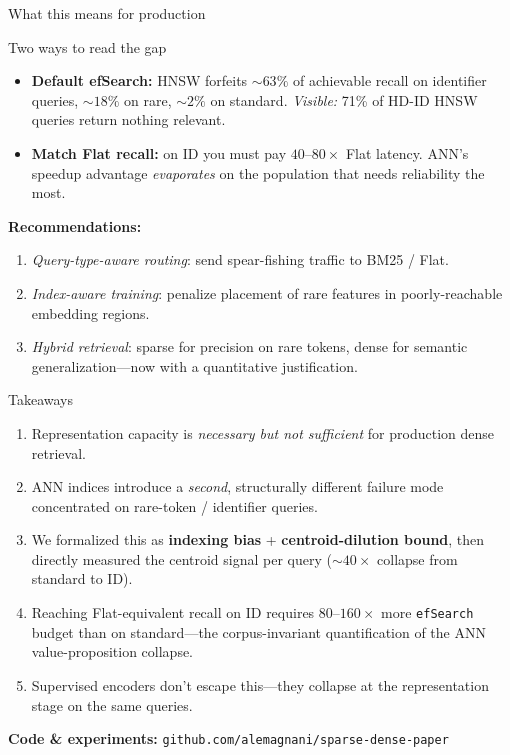 \documentclass[10pt,aspectratio=169]{beamer}
\begin{document}
\begin{frame}{What this means for production}
  \begin{block}{Two ways to read the gap}
    \begin{itemize}
      \item \textbf{Default efSearch:} HNSW forfeits $\sim 63\%$ of achievable
            recall on identifier queries, $\sim 18\%$ on rare, $\sim 2\%$ on standard.
            \emph{Visible:} 71\% of HD-ID HNSW queries return nothing relevant.
      \item \textbf{Match Flat recall:} on ID you must pay $40$--$80\times$ Flat
            latency. ANN's speedup advantage \emph{evaporates} on the population
            that needs reliability the most.
    \end{itemize}
  \end{block}

  \medskip
  \textbf{Recommendations:}
  \begin{enumerate}
    \item \emph{Query-type-aware routing}: send spear-fishing traffic to BM25 / Flat.
    \item \emph{Index-aware training}: penalize placement of rare features in
          poorly-reachable embedding regions.
    \item \emph{Hybrid retrieval}: sparse for precision on rare tokens, dense for
          semantic generalization---now with a quantitative justification.
  \end{enumerate}
\end{frame}

\begin{frame}{Takeaways}
  \begin{enumerate}
    \item Representation capacity is \emph{necessary but not sufficient} for
          production dense retrieval.
    \item ANN indices introduce a \emph{second}, structurally different failure
          mode concentrated on rare-token / identifier queries.
    \item We formalized this as \textbf{indexing bias} + \textbf{centroid-dilution
          bound}, then directly measured the centroid signal per query
          ($\sim 40\times$ collapse from standard to ID).
    \item Reaching Flat-equivalent recall on ID requires $80$--$160\times$ more
          \texttt{efSearch} budget than on standard---the corpus-invariant
          quantification of the ANN value-proposition collapse.
    \item Supervised encoders don't escape this---they collapse at the
          representation stage on the same queries.
  \end{enumerate}

  \vfill
  \begin{center}
    \large
    \textbf{Code \& experiments:} \texttt{github.com/alemagnani/sparse-dense-paper}
  \end{center}
\end{frame}
\end{document}
